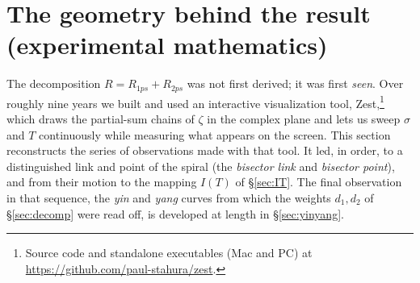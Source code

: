 \documentclass[11pt]{article}
\theoremstyle{definition}
\begin{document}
\section{The geometry behind the result (experimental mathematics)}\label{sec:geometry}

The decomposition $R=R_{1ps}+R_{2ps}$ was not first derived; it was first
\emph{seen}. Over roughly nine years we built and used an interactive
visualization tool, Zest,\footnote{Source code and standalone executables (Mac
and PC) at \url{https://github.com/paul-stahura/zest}.} which draws the
partial-sum chains of $\zeta$ in the complex plane and lets us sweep $\sigma$
and $T$ continuously while measuring what appears on the screen. This section
reconstructs the series of observations made with that tool. It led, in order,
to a distinguished link and point of the spiral (the \emph{bisector link} and
\emph{bisector point}), and from their motion to the mapping $I(T)$ of
\S\ref{sec:IT}. The final observation in that sequence, the \emph{yin} and
\emph{yang} curves from which the weights $d_1,d_2$ of \S\ref{sec:decomp}
were read off, is developed at length in \S\ref{sec:yinyang}.
\end{document}
